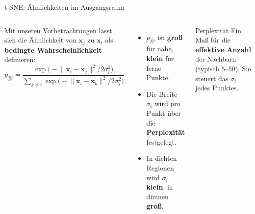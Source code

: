 \begin{frame}{t-SNE: Ähnlichkeiten im Ausgangsraum}
\footnotesize
\begin{columns}
Mit unseren Vorbetrachtungen lässt sich die Ähnlichkeit von $\mathbf{x}_j$ zu $\mathbf{x}_i$ als \textbf{bedingte
Wahrscheinlichkeit} definieren:
\[
  p_{j|i} =
  \frac{\exp\bigl(-\lVert \mathbf{x}_i - \mathbf{x}_j \rVert^2 / 2\sigma_i^2\bigr)}
       {\sum_{k \neq i} \exp\bigl(-\lVert \mathbf{x}_i - \mathbf{x}_k \rVert^2 / 2\sigma_i^2\bigr)}
\]

\begin{itemize}
  \item $p_{j|i}$ ist \textbf{groß} für nahe, \textbf{klein} für ferne
        Punkte.
  \item Die Breite $\sigma_i$ wird pro Punkt über die \textbf{Perplexität}
        festgelegt.
  \item In dichten Regionen wird $\sigma_i$ \textbf{klein}, in dünnen
        \textbf{groß}.
\end{itemize}

\begin{block}{\footnotesize Perplexität}
Ein Maß für die \textbf{effektive Anzahl} der Nachbarn (typisch $5$--$50$).
Sie steuert das $\sigma_i$ jedes Punktes.
\end{block}
\end{columns}
\end{frame}

